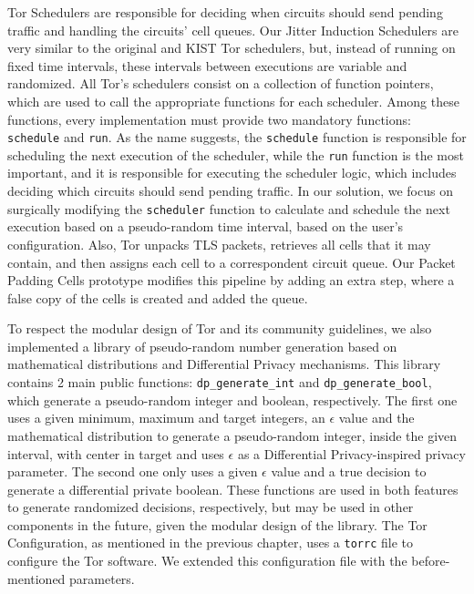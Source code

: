 Tor Schedulers are responsible for deciding when circuits should send pending traffic and handling the circuits' cell queues.  Our Jitter Induction Schedulers are very similar to the original and KIST Tor schedulers, but, instead of running on fixed time intervals, these intervals between executions are variable and randomized. All Tor's schedulers consist on a collection of function pointers, which are used to call the appropriate functions for each scheduler. Among these functions, every implementation must provide two mandatory functions: \texttt{schedule} and \texttt{run}. As the name suggests, the \texttt{schedule} function is responsible for scheduling the next execution of the scheduler, while the \texttt{run} function is the most important, and it is responsible for executing the scheduler logic, which includes deciding which circuits should send pending traffic.
In our solution, we focus on surgically modifying the \texttt{scheduler} function to calculate and schedule the next execution based on a pseudo-random time interval, based on the user's configuration.  
Also, Tor unpacks TLS packets, retrieves all cells that it may contain, and then assigns each cell to a correspondent circuit queue. Our Packet Padding Cells prototype modifies this pipeline by adding an extra step, where a false copy of the cells is created and added the queue.

To respect the modular design of Tor and its community guidelines, we also implemented a library of pseudo-random number generation based on mathematical distributions and Differential Privacy mechanisms. This library contains 2 main public functions: \texttt{dp\_generate\_int} and \texttt{dp\_generate\_bool}, which generate a pseudo-random integer and boolean, respectively. The first one uses a given minimum, maximum and target integers, an $\epsilon$ value and the mathematical distribution to generate a pseudo-random integer, inside the given interval, with center in target and uses $\epsilon$ as a Differential Privacy-inspired privacy parameter. The second one only uses a given $\epsilon$ value and a true decision to generate a differential private boolean. These functions are used in both features to generate randomized decisions, respectively, but may be used in other components in the future, given the modular design of the library.
The Tor Configuration, as mentioned in the previous chapter, uses a \texttt{torrc} file to configure the Tor software. We extended this configuration file with the before-mentioned parameters.


